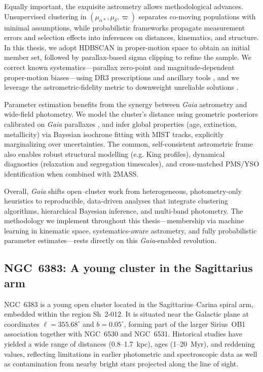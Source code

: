 \documentclass[../main.tex]{subfiles}
\begin{document}
Equally important, the exquisite astrometry allows methodological advances. Unsupervised clustering in $(\mu_{\alpha*},\mu_\delta,\varpi)$ separates co-moving populations with minimal assumptions, while probabilistic frameworks propagate measurement errors and selection effects into inferences on distances, kinematics, and structure. In this thesis, we adopt HDBSCAN in proper-motion space to obtain an initial member set, followed by parallax-based sigma clipping to refine the sample. We correct known systematics—parallax zero-point and magnitude-dependent proper-motion biases—using DR3 prescriptions and ancillary tools \citep{2021A&A...649A...2L,2021A&A...649A.124C}, and we leverage the astrometric-fidelity metric to downweight unreliable solutions \citep{2022MNRAS.510.2597R}.

Parameter estimation benefits from the synergy between \textit{Gaia} astrometry and wide-field photometry. We model the cluster’s distance using geometric posteriors calibrated on \textit{Gaia} parallaxes \citep{2021AJ....161..147B}, and infer global properties (age, extinction, metallicity) via Bayesian isochrone fitting with MIST tracks, explicitly marginalizing over uncertainties. The common, self-consistent astrometric frame also enables robust structural modelling (e.g. King profiles), dynamical diagnostics (relaxation and segregation timescales), and cross-matched PMS/YSO identification when combined with 2MASS.

Overall, \textit{Gaia} shifts open–cluster work from heterogeneous, photometry-only heuristics to reproducible, data-driven analyses that integrate clustering algorithms, hierarchical Bayesian inference, and multi-band photometry. The methodology we implement throughout this thesis—membership via machine learning in kinematic space, systematics-aware astrometry, and fully probabilistic parameter estimates—rests directly on this \textit{Gaia}-enabled revolution.
\subsection{NGC~6383: A young cluster in the Sagittarius arm}

NGC~6383 is a young open cluster located in the Sagittarius--Carina spiral arm, embedded within the  region Sh~2-012. It is situated near the Galactic plane at coordinates $\ell = 355.68^{\circ}$ and $b = 0.05^{\circ}$, forming part of the larger Sirius~OB1 association together with NGC~6530 and NGC~6531. Historical studies have yielded a wide range of distances (0.8--1.7~kpc), ages (1--20~Myr), and reddening values, reflecting limitations in earlier photometric and spectroscopic data as well as contamination from nearby bright stars projected along the line of sight.
\end{document}
